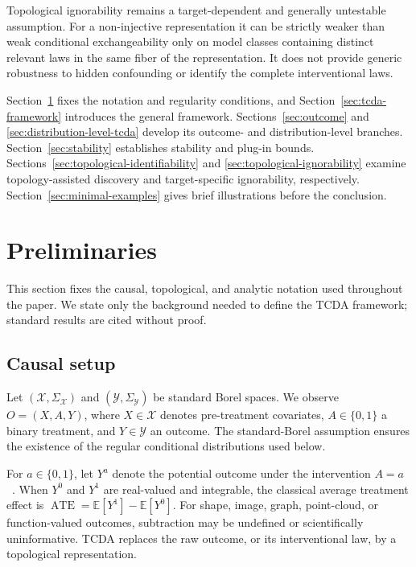 \documentclass[11pt,a4paper]{article}
\theoremstyle{plain}
\theoremstyle{definition}
\theoremstyle{remark}
\newcommand{\1}{\mathbbm{1}}
\begin{document}
Topological ignorability remains a target-dependent and generally untestable assumption. For a non-injective representation it can be strictly weaker than weak conditional exchangeability only on model classes containing distinct relevant laws in the same fiber of the representation. It does not provide generic robustness to hidden confounding or identify the complete interventional laws.

Section~\ref{sec:preliminaries} fixes the notation and regularity conditions, and Section~\ref{sec:tcda-framework} introduces the general framework. Sections~\ref{sec:outcome} and
\ref{sec:distribution-level-tcda} develop its outcome- and distribution-level branches. Section~\ref{sec:stability} establishes stability and plug-in bounds. Sections~\ref{sec:topological-identifiability} and
\ref{sec:topological-ignorability} examine topology-assisted discovery and target-specific ignorability, respectively. Section~\ref{sec:minimal-examples} gives brief illustrations before the conclusion.



\section{Preliminaries}
\label{sec:preliminaries}

This section fixes the causal, topological, and analytic notation used throughout the paper. We state only the background needed to define the TCDA framework; standard results are cited without proof.

\subsection{Causal setup}
\label{subsec:causal-setup}

Let \((\mathcal X,\Sigma_{\mathcal X})\) and
\((\mathcal Y,\Sigma_{\mathcal Y})\) be standard Borel spaces. We observe \(O=(X,A,Y)\), where \(X\in\mathcal X\) denotes pre-treatment covariates, \(A\in\{0,1\}\) a binary treatment, and \(Y\in\mathcal Y\) an outcome. The standard-Borel assumption ensures the existence of the regular conditional distributions used below.

For \(a\in\{0,1\}\), let \(Y^a\) denote the potential outcome under the intervention \(A=a\)~\citep{rubin1974,pearl2009,imbensrubin2015}. When
\(Y^0\) and \(Y^1\) are real-valued and integrable, the classical average treatment effect is
\(\operatorname{ATE} = \mathbb E[Y^1]-\mathbb E[Y^0]\). For shape, image, graph, point-cloud, or function-valued outcomes, subtraction may be undefined or scientifically uninformative. TCDA replaces the raw outcome, or its interventional law, by a topological representation.
\end{document}
